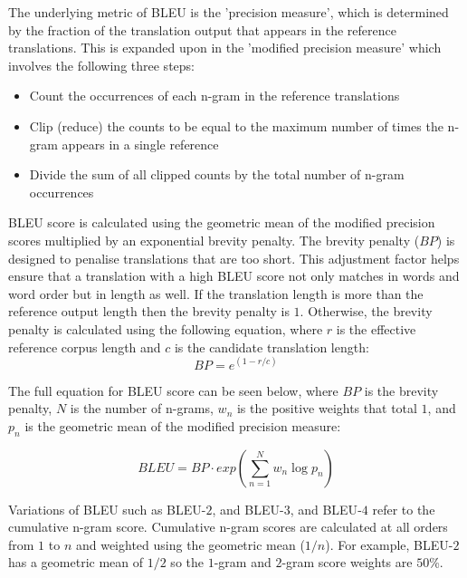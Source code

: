 The underlying metric of \acrshort{BLEU} is the 'precision measure', which is determined by the fraction of the translation output that appears in the reference translations. This is expanded upon in the 'modified precision measure' which involves the following three steps:
\begin{itemize}
    \item Count the occurrences of each n-gram in the reference translations
    \item Clip (reduce) the counts to be equal to the maximum number of times the n-gram appears in a single reference
    \item Divide the sum of all clipped counts by the total number of n-gram occurrences
\end{itemize}

\acrshort{BLEU} score is calculated using the geometric mean of the modified precision scores multiplied by an exponential brevity penalty.
The brevity penalty ($BP$) is designed to penalise translations that are too short. This adjustment factor helps ensure that a translation with a high \acrshort{BLEU} score not only matches in words and word order but in length as well.
If the translation length is more than the reference output length then the brevity penalty is $1$. Otherwise, the brevity penalty is calculated using the following equation, where $r$ is the effective reference corpus length and $c$ is the candidate translation length:
\begin{equation}
    BP = e^{(1-r/c)}
\end{equation}

The full equation for BLEU score can be seen below, where $BP$ is the brevity penalty, $N$ is the number of n-grams, $w_n$ is the positive weights that total $1$, and $p_n$ is the geometric mean of the modified precision measure:

\begin{equation}
    BLEU = BP \cdot exp\left (  \sum_{n=1}^{N} w_{n} \log  p_{n}\right )
\end{equation}


Variations of BLEU such as \acrshort{BLEU}-$2$, and \acrshort{BLEU}-$3$, and \acrshort{BLEU}-$4$ refer to the cumulative n-gram score. Cumulative n-gram scores are calculated at all orders from $1$ to $n$ and weighted using the geometric mean ($1/n$). For example, \acrshort{BLEU}-$2$ has a geometric mean of $1/2$ so the $1$-gram and $2$-gram score weights are $50$\%.

